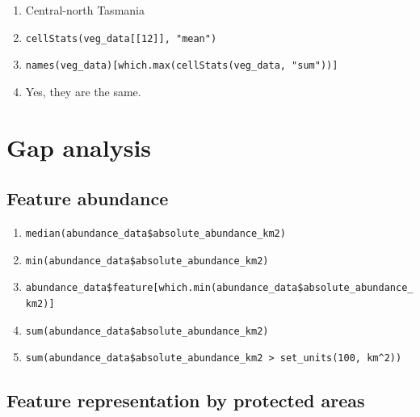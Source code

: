 \documentclass[12pt,]{book}
\makeatletter
\providecommand{\tightlist}{%
  \setlength{\itemsep}{0pt}\setlength{\parskip}{0pt}}
\newenvironment{kframe}{%
\medskip{}
\setlength{\fboxsep}{.8em}
 \def\at@end@of@kframe{}%
 \ifinner\ifhmode%
  \def\at@end@of@kframe{\end{minipage}}%
  \begin{minipage}{\columnwidth}%
 \fi\fi%
 \def\FrameCommand##1{\hskip\@totalleftmargin \hskip-\fboxsep
 \colorbox{shadecolor}{##1}\hskip-\fboxsep
     \hskip-\linewidth \hskip-\@totalleftmargin \hskip\columnwidth}%
 \MakeFramed {\advance\hsize-\width
   \@totalleftmargin\z@ \linewidth\hsize
   \@setminipage}}%
 {\par\unskip\endMakeFramed%
 \at@end@of@kframe}
\newenvironment{rmdblock}[1]
  {
  \begin{itemize}
  \renewcommand{\labelitemi}{
    \raisebox{-.7\height}[0pt][0pt]{
      {\setkeys{Gin}{width=3em,keepaspectratio}\texttt{[image: images/\#1]}}
    }
  }
  \setlength{\fboxsep}{1em}
  \begin{kframe}
  \item
  }
  {
  \end{kframe}
  \end{itemize}
  }
\newenvironment{rmdanswer}
  {\begin{rmdblock}{answer}}
  {\end{rmdblock}}
\makeatother
\begin{document}
\begin{rmdanswer}
\begin{enumerate}
\def\labelenumi{\arabic{enumi}.}
\tightlist
\item
  Central-north Tasmania
\item
  \texttt{cellStats(veg\_data{[}{[}12{]}{]},\ "mean")}
\item
  \texttt{names(veg\_data){[}which.max(cellStats(veg\_data,\ "sum")){]}}
\item
  Yes, they are the same.
\end{enumerate}
\end{rmdanswer}

\hypertarget{gap-analysis-1}{%
\section{Gap analysis}\label{gap-analysis-1}}

\hypertarget{feature-abundance-1}{%
\subsection{Feature abundance}\label{feature-abundance-1}}

\begin{rmdanswer}
\begin{enumerate}
\def\labelenumi{\arabic{enumi}.}
\tightlist
\item
  \texttt{median(abundance\_data\$absolute\_abundance\_km2)}
\item
  \texttt{min(abundance\_data\$absolute\_abundance\_km2)}
\item
  \texttt{abundance\_data\$feature{[}which.min(abundance\_data\$absolute\_abundance\_km2){]}}
\item
  \texttt{sum(abundance\_data\$absolute\_abundance\_km2)}
\item
  \texttt{sum(abundance\_data\$absolute\_abundance\_km2\ \textgreater{}\ set\_units(100,\ km\^{}2))}
\end{enumerate}
\end{rmdanswer}

\hypertarget{feature-representation-by-protected-areas-1}{%
\subsection{Feature representation by protected areas}\label{feature-representation-by-protected-areas-1}}
\end{document}

